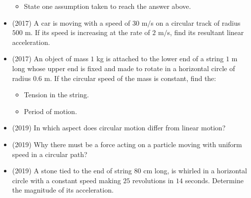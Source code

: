 \documentclass{article}
\begin{document}
\begin{itemize}
\begin{itemize}
\item State one assumption taken to reach the answer above.
\end{itemize}
\item (2017)  A car is moving with a speed of $ 30$ m$/$s on a circular track of radius $ 500$ m. If its speed is increasing at the rate of $ 2$ m$/$s, find its resultant linear acceleration.
\item (2017)  An object of mass $ 1$ kg is attached to the lower end of a string $ 1$ m long whose upper end is fixed and made to rotate in a horizontal circle of radius $ 0.6$ m. If the circular speed of the mass is constant, find the:
 \begin{itemize}
\item Tension in the string. 
\item Period of motion. 
\end{itemize}
\item (2019)  In which aspect does circular motion differ from linear motion? 
\item (2019)  Why there must be a force acting on a particle moving with uniform speed in a circular path? 
\item (2019)  A stone tied to the end of string $ 80$ cm long, is whirled in a horizontal circle with a constant speed making $ 25$ revolutions in $ 14$ seconds. Determine the magnitude of its acceleration. 
\end{itemize}
\end{document}
